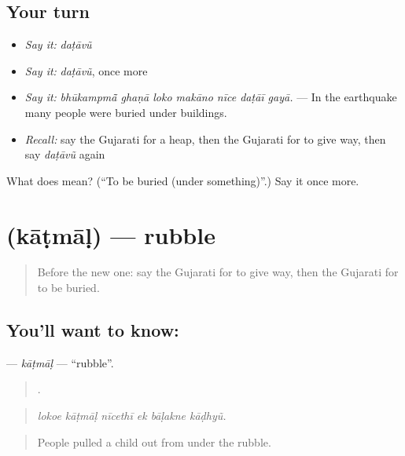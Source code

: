 \subsection*{Your turn}
\begin{itemize}
\raggedright
  \item \emph{Say it:} \emph{daṭāvũ}
  \item \emph{Say it:} \emph{daṭāvũ}, once more
  \item \emph{Say it:} \emph{bhūkampmā̃ ghaṇā loko makāno nīce daṭāī gayā.} — In the earthquake many people were buried under buildings.
  \item \emph{Recall:} say the Gujarati for a heap, then the Gujarati for to give way, then say \emph{daṭāvũ} again
\end{itemize}

\begin{tcolorbox}[breakable,colback=teal!4,colframe=teal!35!black,title={Before you move on}]
What does  mean? (\textquotedblleft{}To be buried (under something)\textquotedblright{}.) Say it once more.
\end{tcolorbox}
\section[\texorpdfstring{\gu{કાટમાળ} (kāṭmāḷ)}{કાટમાળ (kāṭmāḷ)}]{ (kāṭmāḷ) — rubble}

\label{lesson:GU-C305-katmal}



\begin{quote}
Before the new one: say the Gujarati for to give way, then the Gujarati for to be buried.
\end{quote}

\subsection*{You'll want to know: }
\textbf{} — \emph{kāṭmāḷ} — \textquotedblleft{}rubble\textquotedblright{}.

\begin{quote}
     .
\end{quote}

\begin{quote}
\emph{lokoe kāṭmāḷ nīcethī ek bāḷakne kāḍhyũ.}
\end{quote}

\begin{quote}
People pulled a child out from under the rubble.
\end{quote}

